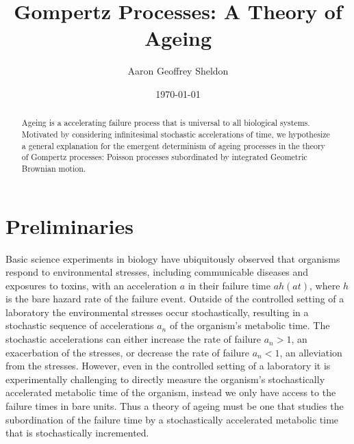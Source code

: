 \documentclass{article}
\theoremstyle{definition}\newtheorem{definition}{Definition}
\begin{document}
  \title{Gompertz Processes: A Theory of Ageing}
  \author{Aaron Geoffrey Sheldon}
  \date{\today}
  \maketitle

  \begin{abstract}
    Ageing is a accelerating failure process that is universal to all biological systems.
    Motivated by considering infinitesimal stochastic accelerations of time, we hypothesize
    a general explanation for the emergent determinism of ageing processes in the theory of
    Gompertz processes: Poisson processes subordinated by integrated Geometric Brownian
    motion.
  \end{abstract}

  \section{Preliminaries}
  Basic science experiments in biology have ubiquitously observed that organisms respond to
  environmental stresses, including communicable diseases and exposures to toxins, with an
  acceleration $a$ in their failure time $a h\left(a t\right)$, where $h$ is the bare hazard
  rate of the failure event. Outside of the controlled setting of a laboratory the
  environmental stresses occur stochastically, resulting in a stochastic sequence of
  accelerations $a_n$ of the organism's metabolic time. The stochastic accelerations can
  either increase the rate of failure $a_n > 1$, an exacerbation of the stresses, or
  decrease the rate of failure $a_n < 1$, an alleviation from the stresses. However, even in
  the controlled setting of a laboratory it is experimentally challenging to directly
  measure the organism's stochastically accelerated metabolic time of the organism, instead
  we only have access to the failure times in bare units. Thus a theory of ageing must be
  one that studies the subordination of the failure time by a stochastically accelerated
  metabolic time that is stochastically incremented.
\end{document}
